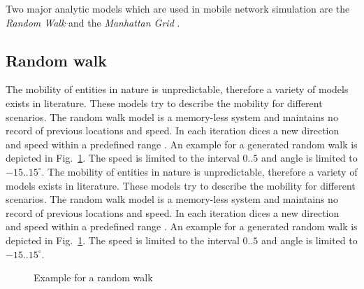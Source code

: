 Two major analytic models which are used in mobile network simulation are the \emph{Random Walk} \cite{Akyildiz2000,Bettstetter2001,Bettstetter2002} and the \emph{Manhattan Grid} \cite{Markoulidakis1997}.



\subsection{Random walk}
The mobility of entities in nature is unpredictable, therefore a variety of models exists in literature. These models try to describe the mobility for different scenarios. The random walk model is a memory-less system and maintains no record of previous locations and speed. In each iteration dices a new direction and speed within a predefined range \cite{Camp2002}. An example for a generated random walk is depicted in Fig.\ \ref{fig:randomwalk}. The speed is limited to the interval $0..5$ and angle is limited to $-15..15^\circ$.
The mobility of entities in nature is unpredictable, therefore a variety of models exists in literature. These models try to describe the mobility for different scenarios. The random walk model is a memory-less system and maintains no record of previous locations and speed. In each iteration dices a new direction and speed within a predefined range \cite{Camp2002}. An example for a generated random walk is depicted in Fig.\ \ref{fig:randomwalk}. The speed is limited to the interval $0..5$ and angle is limited to $-15..15^\circ$.
\begin{figure}
	\centering
	\caption{Example for a random walk}
	\label{fig:randomwalk}
\end{figure}

